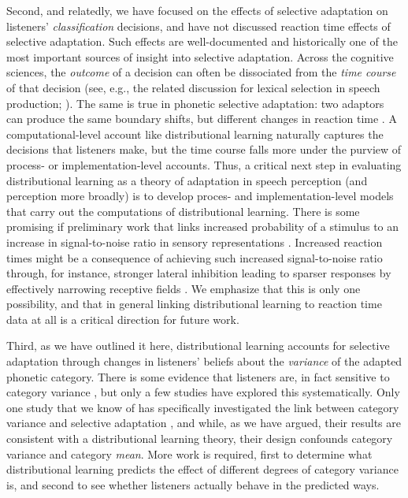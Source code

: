 Second, and relatedly, we have focused on the effects of selective adaptation on listeners' \emph{classification} decisions, and have not discussed reaction time effects of selective adaptation.  Such effects are well-documented \cite{Samuel1986,Samuel1996} and historically one of the most important sources of insight into selective adaptation.  Across the cognitive sciences, the \emph{outcome} of a decision can often be dissociated from the \emph{time course} of that decision (see, e.g., the related discussion for lexical selection in speech production; ).  The same is true in phonetic selective adaptation: two adaptors can produce the same boundary shifts, but different changes in reaction time \cite{Samuel1996}.  A computational-level account like distributional learning naturally captures the decisions that listeners make, but the time course falls more under the purview of process- or implementation-level accounts.  Thus, a critical next step in evaluating distributional learning as a theory of adaptation in speech perception (and perception more broadly) is to develop proces- and implementation-level models that carry out the computations  of distributional learning.  There is some promising if preliminary work that links increased probability of a stimulus to an increase in signal-to-noise ratio in sensory representations \cite{Stocker2006,Wei2012}.  Increased reaction times might be a consequence of achieving such increased signal-to-noise ratio through, for instance, stronger lateral inhibition leading to sparser responses by effectively narrowing receptive fields \cite{Gardner2004}.  We emphasize that this is only one possibility, and that in general linking distributional learning to reaction time data at all is a critical direction for future work.

Third, as we have outlined it here, distributional learning accounts for selective adaptation through changes in listeners' beliefs about the \emph{variance} of the adapted phonetic category.  There is some evidence that listeners are, in fact sensitive to category variance \cite{Clayards2008,Cole1977,Newman2001,Schreiber2013}, but only a few studies have explored this systematically.  Only one study that we know of has specifically investigated the link between category variance and selective adaptation \cite{Cole1977}, and while, as we have argued, their results are consistent with a distributional learning theory, their design confounds category variance and category \emph{mean}.  More work is required, first to determine what distributional learning predicts the effect of different degrees of category variance is, and second to see whether listeners actually behave in the predicted ways.

